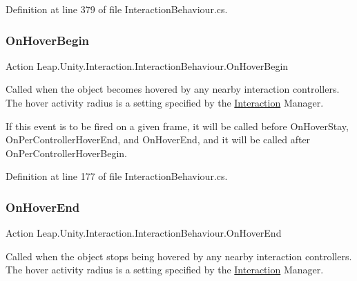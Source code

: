 Definition at line 379 of file Interaction\+Behaviour.\+cs.

\mbox{\label{class_leap_1_1_unity_1_1_interaction_1_1_interaction_behaviour_a9b7a21598c9ef47a9b38290b0ba4fd7c}} 
\subsubsection{\texorpdfstring{OnHoverBegin}{OnHoverBegin}}
{\footnotesize\ttfamily Action Leap.\+Unity.\+Interaction.\+Interaction\+Behaviour.\+On\+Hover\+Begin}



Called when the object becomes hovered by any nearby interaction controllers. The hover activity radius is a setting specified by the \mbox{\hyperlink{namespace_leap_1_1_unity_1_1_interaction}{Interaction}} Manager. 

If this event is to be fired on a given frame, it will be called before On\+Hover\+Stay, On\+Per\+Controller\+Hover\+End, and On\+Hover\+End, and it will be called after On\+Per\+Controller\+Hover\+Begin. 

Definition at line 177 of file Interaction\+Behaviour.\+cs.

\mbox{\label{class_leap_1_1_unity_1_1_interaction_1_1_interaction_behaviour_afd5b0e013d3253ccde7d99f0b6508ae2}} 
\subsubsection{\texorpdfstring{OnHoverEnd}{OnHoverEnd}}
{\footnotesize\ttfamily Action Leap.\+Unity.\+Interaction.\+Interaction\+Behaviour.\+On\+Hover\+End}



Called when the object stops being hovered by any nearby interaction controllers. The hover activity radius is a setting specified by the \mbox{\hyperlink{namespace_leap_1_1_unity_1_1_interaction}{Interaction}} Manager. 

